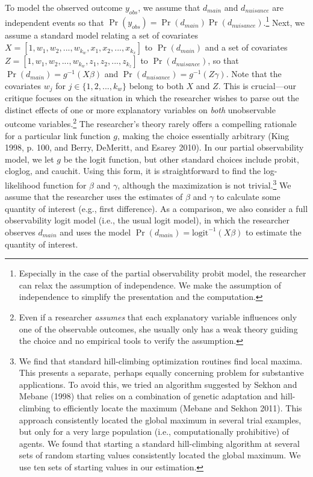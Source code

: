 \documentclass[10pt]{article}
\begin{document}
To model the observed outcome $y_{obs}$, we assume that $d_{main}$ and $d_{nuisance}$ are independent events so that $\Pr(y_{obs}) = \Pr(d_{main})\Pr(d_{nuisance})$.\footnote{Especially in the case of the partial observability probit model, the researcher can relax the assumption of independence. 
We make the assumption of independence to simplify the presentation and the computation.} 
Next, we assume a standard model relating a set of covariates $X = [1, w_1, w_2,..., w_{k_w}, x_1, x_2,..., x_{k_x}]$ to $\Pr(d_{main})$ and a set of covariates $Z = [1, w_1, w_2,..., w_{k_w}, z_1, z_2,..., z_{k_z}]$ to $\Pr(d_{nuisance})$, so that $\Pr(d_{main}) = g^{-1}(X\beta)$ and $\Pr(d_{nuisance}) = g^{-1}(Z\gamma)$.
Note that the covariates $w_j$ for $j \in \{1, 2,..., k_w\}$ belong to both $X$ and $Z$. 
This is crucial---our critique focuses on the situation in which the researcher wishes to parse out the distinct effects of one or more explanatory variables on \textit{both} unobservable outcome variables.\footnote{Even if a researcher \textit{assumes} that each explanatory variable influences only one of the observable outcomes, she usually only has a weak theory guiding the choice and no empirical tools to verify the assumption.} 
The researcher's theory rarely offers a compelling rationale for a particular link function $g$, making the choice essentially arbitrary (King 1998, p. 100, and Berry, DeMeritt, and Esarey 2010).
In our partial observability model, we let $g$ be the logit function, but other standard choices include probit, cloglog, and cauchit.
Using this form, it is straightforward to find the log-likelihood function for $\beta$ and $\gamma$, although the maximization is not trivial.\footnote{We find that standard hill-climbing optimization routines find local maxima. 
This presents a separate, perhaps equally concerning problem for substantive applications. 
To avoid this, we tried an algorithm suggested by Sekhon and Mebane (1998) that relies on a combination of genetic adaptation and hill-climbing to efficiently locate the maximum (Mebane and Sekhon 2011). 
This approach consistently located the global maximum in several trial examples, but only for a very large population (i.e., computationally prohibitive) of agents. 
We found that starting a standard hill-climbing algorithm at several sets of random starting values consistently located the global maximum. 
We use ten sets of starting values in our estimation.} 
We assume that the researcher uses the estimates of $\beta$ and $\gamma$ to calculate some quantity of interest (e.g., first difference). 
As a comparison, we also consider a full observability logit model (i.e., the usual logit model), in which the researcher observes $d_{main}$ and uses the model $\Pr(d_{main}) = \text{logit}^{-1}(X\beta)$ to estimate the quantity of interest.
\end{document}
